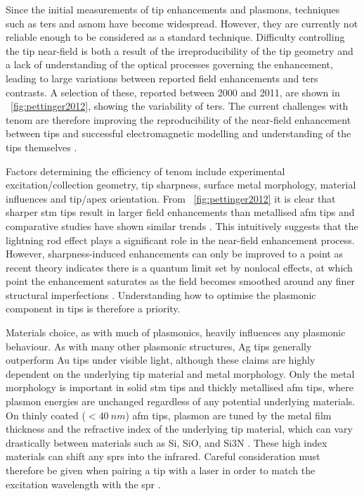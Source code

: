 \documentclass{article}
\begin{document}
Since the initial measurements of tip enhancements and plasmons, techniques such as \gls{ters} and \gls{asnom} have become widespread. However, they are currently not reliable enough to be considered as a standard technique. Difficulty controlling the tip near-field is both a result of the irreproducibility of the tip geometry and a lack of understanding of the optical processes governing the enhancement, leading to large variations between reported field enhancements and \gls{ters} contrasts. A selection of these, reported between 2000 and 2011, are shown in \figurename~\ref{fig:pettinger2012}, showing the variability of \gls{ters}. The current challenges with \gls{tenom} are therefore improving the reproducibility of the near-field enhancement between tips \cite{blum2014, kumar2014, mino2014} and successful electromagnetic modelling and understanding of the tips themselves \cite{zhang2009}. %

Factors determining the efficiency of \gls{tenom} include experimental excitation/collection geometry, tip sharpness, surface metal morphology, material influences and tip/apex orientation. From \figurename~\ref{fig:pettinger2012} it is clear that sharper \gls{stm} tips result in larger field enhancements than metallised \gls{afm} tips and comparative studies have shown similar trends \cite{raschke2003, yeo2006, picardi2007}. This intuitively suggests that the lightning rod effect plays a significant role in the near-field enhancement process. However, sharpness-induced enhancements can only be improved to a point as recent theory indicates there is a quantum limit set by nonlocal effects, at which point the enhancement saturates as the field becomes smoothed around any finer structural imperfections \cite{wiener2012}. Understanding how to optimise the plasmonic component in tips is therefore a priority.

Materials choice, as with much of plasmonics, heavily influences any plasmonic behaviour. As with many other plasmonic structures, Ag tips generally outperform Au tips under visible light, although these claims are highly dependent on the underlying tip material and metal morphology. Only the metal morphology is important in solid \gls{stm} tips and thickly metallised \gls{afm} tips, where plasmon energies are unchanged regardless of any potential underlying materials. On thinly coated ($<\SI{40}{nm}$) \gls{afm} tips, plasmon are tuned by the metal film thickness \cite{huber2014} and the refractive index of the underlying tip material, which can vary drastically between materials such as Si, SiO, and Si\subs3N \cite{picardi2007, taguchi2009}. These high index materials can shift any \glspl{spr} into the infrared. Careful consideration must therefore be given when pairing a tip with a laser in order to match the excitation wavelength with the \gls{spr} \cite{yeo2006, yeo2007, cui2007, hayazawa2012}.
\end{document}
